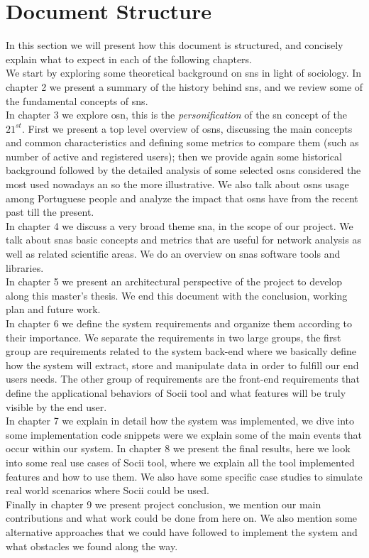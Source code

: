 \section{Document Structure}
In this section we will present how this document is structured, and concisely explain what to expect in each of the following chapters.\\
\indent We start by exploring some theoretical background on \glspl{sn} in light of sociology. In chapter 2 we present a summary of the history behind \glspl{sn}, and we review some of the fundamental concepts of \glspl{sn}.\\
\indent In chapter 3 we explore \acrfull{osn}, this is the \textit{personification} of the \gls{sn} concept of the $21^{st}$. First we present a top level overview of \glspl{osn}, discussing the main concepts and common characteristics and defining some metrics to compare them (such as number of active and registered users); then we provide again some historical background followed by the detailed analysis of some selected \glspl{osn} considered the most used nowadays an so the more illustrative. We also talk about \glspl{osn} usage among Portuguese people and analyze the impact that \glspl{osn} have from the recent past till the present.\\
\indent In chapter 4 we discuss a very broad theme \acrfull{sna}, in the scope of our project. We talk about \glspl{sna} basic concepts and metrics that are useful for network analysis as well as related scientific areas. We do an overview on \glspl{sna} software tools and libraries.\\
\indent In chapter 5 we present an architectural perspective of the project to develop along this master's thesis. We end this document with the conclusion, working plan and future work.\\
\indent In chapter 6 we define the system requirements and organize them according to their importance. We separate the requirements in two large groups, the first group are requirements related to the system back-end where we basically define how the system will extract, store and manipulate data in order to fulfill our end users needs. The other group of requirements are the front-end requirements that define the applicational behaviors of Socii tool and what features will be truly visible by the end user.\\
\indent In chapter 7 we explain in detail how the system was implemented, we dive into some implementation code snippets were we explain some of the main events that occur within our system.
\indent In chapter 8 we present the final results, here we look into some real use cases of Socii tool, where we explain all the tool implemented features and how to use them. We also have some specific case studies to simulate real world scenarios where Socii could be used.\\
\indent Finally in chapter 9 we present project conclusion, we mention our main contributions and what work could be done from here on. We also mention some alternative approaches that we could have followed to implement the system and what obstacles we found along the way.
